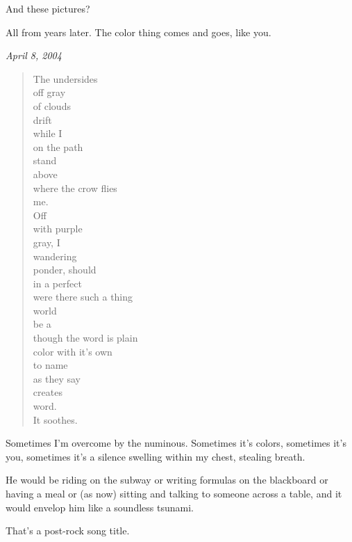 \begin{paracol}{2}
\begin{leftcolumn}
\begin{ally}
And these pictures?
\end{ally}
All from years later. The color thing comes and goes, like you.
\end{leftcolumn}
\begin{rightcolumn*}
\begin{flushright}
\emph{April 8, 2004}
\end{flushright}
\end{rightcolumn*}
\begin{leftcolumn}
\begin{verse}
The undersides\\
\vin \vin off gray\\
\vin of clouds\\
\vin drift\\
\vin \vin while I\\
\vin \vin \vin on the path\\
\vin \vin stand\\
\vin above\\
\vin \vin where the crow flies\\
\vin me.\\
Off\\
\vin \vin with purple\\
\vin gray, I\\
\vin \vin wandering\\
\vin ponder, should\\
\vin \vin in a perfect\\
\vin \vin \vin were there such a thing\\
\vin \vin world\\
\vin be a\\
\vin \vin though the word is plain\\
\vin color with it's own\\
\vin \vin to name\\
\vin \vin \vin as they say\\
\vin \vin creates\\
\vin word.\\
It soothes.
\end{verse}

Sometimes I'm overcome by the numinous. Sometimes it's colors, sometimes it's you, sometimes it's a silence swelling within my chest, stealing breath.

\begin{ally}
He would be riding on the subway or writing formulas on the blackboard or having a meal or (as now) sitting and talking to someone across a table, and it would envelop him like a soundless tsunami.
\end{ally}
That's a post-rock song title.


\end{leftcolumn}
\end{paracol}

